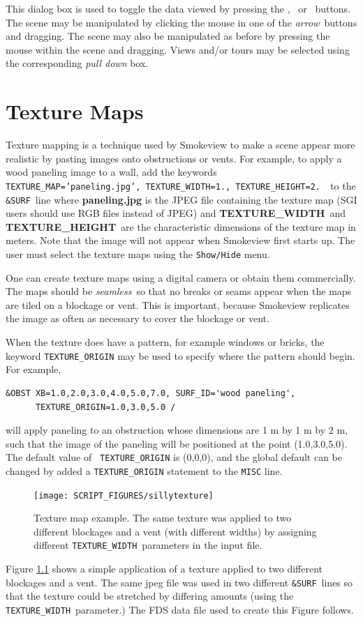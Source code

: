 \documentclass[11pt,twoside]{book}
\newcommand{\frameit}[1]{\fbox{\tt #1}}
\begin{document}
This dialog box is used to toggle the data viewed by pressing the
\frameit{Smoke/Fire}, \frameit{Temperature}\ or \frameit{Oxygen}\
buttons. The scene may be manipulated by clicking the mouse in one
of the {\em arrow}\ buttons and dragging.  The scene may also be
manipulated as before by pressing the mouse within the scene and
dragging. Views and/or tours may be selected using the
corresponding {\em pull down} box.

\chapter{Texture Maps} Texture mapping is a technique used by
Smokeview to make a scene appear more realistic by pasting images
onto obstructions or vents. For example, to apply a wood paneling
image to a wall, add the keywords {\tt
TEXTURE\_MAP='paneling.jpg', TEXTURE\_WIDTH=1., TEXTURE\_HEIGHT=2.
}\ to the {\tt \&SURF}\ line where {\bf paneling.jpg} is the JPEG
file containing the texture map (SGI users should use RGB files
instead of JPEG) and {\bf TEXTURE\_WIDTH}\ and {\bf
TEXTURE\_HEIGHT}\ are the characteristic dimensions of the texture
map in meters. Note that the image will not appear when Smokeview
first starts up. The user must select the texture maps using the
{\tt Show/Hide} menu.

One can create texture maps using a digital camera or obtain them
commercially.  The maps should be {\em seamless}\ so that no
breaks or seams appear when the maps are tiled on a blockage or
vent.  This is important, because Smokeview replicates the image
as often as necessary to cover the blockage or vent.

When the texture does have a pattern, for example windows or
bricks, the keyword {\tt TEXTURE\_ORIGIN} may be used to specify
where the pattern should begin.  For example,
\begin{lstlisting}
&OBST XB=1.0,2.0,3.0,4.0,5.0,7.0, SURF_ID='wood paneling',
      TEXTURE_ORIGIN=1.0,3.0,5.0 /
\end{lstlisting}
\noindent will apply paneling to an obstruction whose dimensions
are 1 m by 1 m by 2 m, such that the image of the paneling will be
positioned at the point (1.0,3.0,5.0). The default value of {\tt
TEXTURE\_ORIGIN} is (0,0,0), and the global default can be changed
by added a {\tt TEXTURE\_ORIGIN} statement to the {\tt MISC} line.

\begin{figure}[\figoptions]
\centerline{\texttt{[image: SCRIPT\_FIGURES/sillytexture]}
} \caption [Texture map example.] {
Texture map example.  The same texture was applied to two different
blockages and a vent (with different widths) by assigning different {\tt TEXTURE\_WIDTH}\
parameters in the input file.
} \label{figTextures}
\end{figure}
Figure \ref{figTextures} shows a simple application of a texture
applied to two different blockages and a vent.  The same jpeg file
was used in two different {\tt \&SURF}\ lines so that the texture
could be stretched by differing amounts (using the {\tt
TEXTURE\_WIDTH}\ parameter.)  The FDS data file used to create
this Figure follows.
\end{document}
